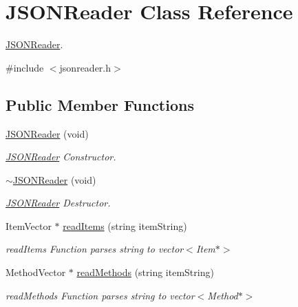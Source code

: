 \hypertarget{class_j_s_o_n_reader}{\section{\-J\-S\-O\-N\-Reader \-Class \-Reference}
\label{class_j_s_o_n_reader}
}


\hyperlink{class_j_s_o_n_reader}{\-J\-S\-O\-N\-Reader}.  




{\ttfamily \#include $<$jsonreader.\-h$>$}

\subsection*{\-Public \-Member \-Functions}
\begin{DoxyCompactItemize}
\item 
\hypertarget{class_j_s_o_n_reader_aa5111b0f5380ead3351fe7ddd439d2db}{\hyperlink{class_j_s_o_n_reader_aa5111b0f5380ead3351fe7ddd439d2db}{\-J\-S\-O\-N\-Reader} (void)}\label{class_j_s_o_n_reader_aa5111b0f5380ead3351fe7ddd439d2db}

\begin{DoxyCompactList}\small\item\em \hyperlink{class_j_s_o_n_reader}{\-J\-S\-O\-N\-Reader} \-Constructor. \end{DoxyCompactList}\item 
\hypertarget{class_j_s_o_n_reader_aca98108ae9cacd3f9bab63affe197fc1}{\hyperlink{class_j_s_o_n_reader_aca98108ae9cacd3f9bab63affe197fc1}{$\sim$\-J\-S\-O\-N\-Reader} (void)}\label{class_j_s_o_n_reader_aca98108ae9cacd3f9bab63affe197fc1}

\begin{DoxyCompactList}\small\item\em \hyperlink{class_j_s_o_n_reader}{\-J\-S\-O\-N\-Reader} \-Destructor. \end{DoxyCompactList}\item 
\-Item\-Vector $\ast$ \hyperlink{class_j_s_o_n_reader_a572936b64ddb306e6030e68983f6ca1e}{read\-Items} (string item\-String)
\begin{DoxyCompactList}\small\item\em read\-Items \-Function parses string to vector$<$\-Item$\ast$$>$ \end{DoxyCompactList}\item 
\-Method\-Vector $\ast$ \hyperlink{class_j_s_o_n_reader_a301f003050a6112673d318539c7fb184}{read\-Methods} (string item\-String)
\begin{DoxyCompactList}\small\item\em read\-Methods \-Function parses string to vector$<$\-Method$\ast$$>$ \end{DoxyCompactList}\end{DoxyCompactItemize}


